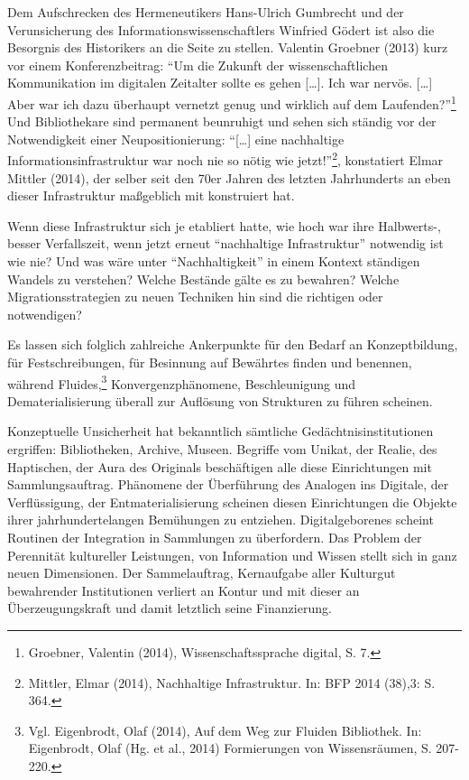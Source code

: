 \documentclass[a4paper,
fontsize=11pt,
oneside,
numbers=noperiodatend,
parskip=half-,
bibliography=totoc,
final
]{scrartcl}
\begin{document}
Dem Aufschrecken des Hermeneutikers Hans-Ulrich Gumbrecht und der
Verunsicherung des Informationswissenschaftlers Winfried Gödert ist also
die Besorgnis des Historikers an die Seite zu stellen. Valentin Groebner
(2013) kurz vor einem Konferenzbeitrag: \enquote{Um die Zukunft der
wissenschaftlichen Kommunikation im digitalen Zeitalter sollte es gehen
{[}\ldots{}{]}. Ich war nervös. {[}\ldots{}{]} Aber war ich dazu
überhaupt vernetzt genug und wirklich auf dem Laufenden?}\footnote{Groebner,
  Valentin (2014), Wissenschaftssprache digital, S. 7.} Und
Bibliothekare sind permanent beunruhigt und sehen sich ständig vor der
Notwendigkeit einer Neupositionierung: \enquote{{[}\ldots{}{]} eine
nachhaltige Informationsinfrastruktur war noch nie so nötig wie
jetzt!}\footnote{Mittler, Elmar (2014), Nachhaltige Infrastruktur. In:
  BFP 2014 (38),3: S. 364.}, konstatiert Elmar Mittler (2014), der
selber seit den 70er Jahren des letzten Jahrhunderts an eben dieser
Infrastruktur maßgeblich mit konstruiert hat.

Wenn diese Infrastruktur sich je etabliert hatte, wie hoch war ihre
Halbwerts-, besser Verfallszeit, wenn jetzt erneut \enquote{nachhaltige
Infrastruktur} notwendig ist wie nie? Und was wäre unter
\enquote{Nachhaltigkeit} in einem Kontext ständigen Wandels zu
verstehen? Welche Bestände gälte es zu bewahren? Welche
Migrationsstrategien zu neuen Techniken hin sind die richtigen oder
notwendigen?

Es lassen sich folglich zahlreiche Ankerpunkte für den Bedarf an
Konzeptbildung, für Festschreibungen, für Besinnung auf Bewährtes finden
und benennen, während Fluides,\footnote{Vgl. Eigenbrodt, Olaf (2014),
  Auf dem Weg zur Fluiden Bibliothek. In: Eigenbrodt, Olaf (Hg. et al.,
  2014) Formierungen von Wissensräumen, S. 207-220.}
Konvergenzphänomene, Beschleunigung und Dematerialisierung überall zur
Auflösung von Strukturen zu führen scheinen.

Konzeptuelle Unsicherheit hat bekanntlich sämtliche
Gedächtnisinstitutionen ergriffen: Bibliotheken, Archive, Museen.
Begriffe vom Unikat, der Realie, des Haptischen, der Aura des Originals
beschäftigen alle diese Einrichtungen mit Sammlungsauftrag. Phänomene
der Überführung des Analogen ins Digitale, der Verflüssigung, der
Entmaterialisierung scheinen diesen Einrichtungen die Objekte ihrer
jahrhundertelangen Bemühungen zu entziehen. Digitalgeborenes scheint
Routinen der Integration in Sammlungen zu überfordern. Das Problem der
Perennität kultureller Leistungen, von Information und Wissen stellt
sich in ganz neuen Dimensionen. Der Sammelauftrag, Kernaufgabe aller
Kulturgut bewahrender Institutionen verliert an Kontur und mit dieser an
Überzeugungskraft und damit letztlich seine Finanzierung.
\end{document}
